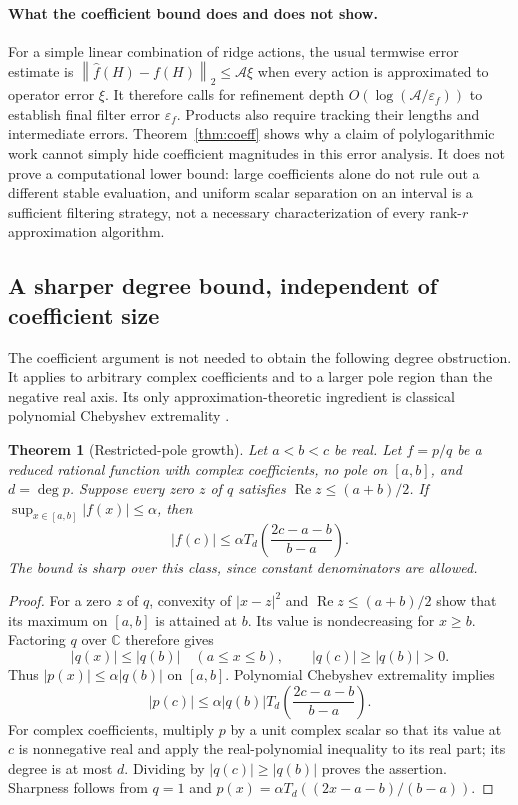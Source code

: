 \documentclass[11pt]{article}
\newtheorem{theorem}{Theorem}
\theoremstyle{remark}
\newcommand{\C}{\mathbb C}
\newcommand{\norm}[1]{\left\lVert#1\right\rVert}
\begin{document}
\paragraph{What the coefficient bound does and does not show.}
For a simple linear combination of ridge actions, the usual termwise error
estimate is \(\norm{\widehat f(H)-f(H)}_2\leq\mathcal A\xi\)
when every action is approximated to operator error \(\xi\).
It therefore calls for refinement depth
\(O(\log(\mathcal A/\varepsilon_f))\) to establish final filter
error \(\varepsilon_f\). Products also require tracking their lengths
and intermediate errors. Theorem~\ref{thm:coeff} shows why a claim of
polylogarithmic work cannot simply hide coefficient magnitudes in this
error analysis. It does not prove a computational lower bound: large
coefficients alone do not rule out a different stable evaluation, and
uniform scalar separation on an interval is a sufficient filtering strategy,
not a necessary characterization of every rank-\(r\) approximation algorithm.

\subsection{A sharper degree bound, independent of coefficient size}
The coefficient argument is not needed to obtain the following degree
obstruction. It applies to arbitrary complex coefficients and to a larger pole
region than the negative real axis. Its only approximation-theoretic ingredient
is classical polynomial Chebyshev extremality \cite{extremal}.

\begin{theorem}[Restricted-pole growth]\label{thm:poles}
Let \(a<b<c\) be real. Let \(f=p/q\) be a reduced rational function with
complex coefficients, no pole on \([a,b]\), and \(d=\deg p\).
Suppose every zero \(z\) of \(q\) satisfies
\(\operatorname{Re}z\leq(a+b)/2\). If
\(\sup_{x\in[a,b]}|f(x)|\leq\alpha\), then
\[
 |f(c)|\leq\alpha T_d\!\left(\frac{2c-a-b}{b-a}\right).
\]
The bound is sharp over this class, since constant denominators are allowed.
\end{theorem}
\begin{proof}
For a zero \(z\) of \(q\), convexity of \(|x-z|^2\) and
\(\operatorname{Re}z\leq(a+b)/2\) show that its maximum on \([a,b]\)
is attained at \(b\). Its value is nondecreasing for \(x\geq b\).
Factoring \(q\) over \(\C\) therefore gives
\[
 |q(x)|\leq|q(b)|\quad(a\leq x\leq b),\qquad
 |q(c)|\geq|q(b)|>0.
\]
Thus \(|p(x)|\leq\alpha|q(b)|\) on \([a,b]\). Polynomial Chebyshev
extremality implies
\[
 |p(c)|\leq\alpha|q(b)|
      T_d\!\left(\frac{2c-a-b}{b-a}\right).
\]
For complex coefficients, multiply \(p\) by a unit complex scalar so that
its value at \(c\) is nonnegative real and apply the real-polynomial
inequality to its real part; its degree is at most \(d\). Dividing by
\(|q(c)|\geq|q(b)|\) proves the assertion. Sharpness follows from
\(q=1\) and \(p(x)=\alpha T_d((2x-a-b)/(b-a))\).
\end{proof}
\end{document}
